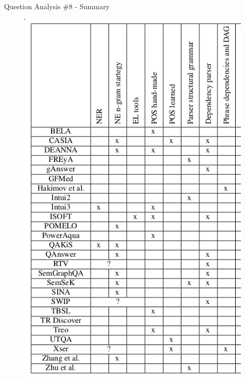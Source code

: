 \documentclass{beamer}
\begin{document}
\begin{frame}{Question Analysis \#8 - Summary}
  \begin{cardTiny}
    \begin{figure}\label{fig:qa_table}
      \centering
      \includegraphics[height=0.8\textheight]{./res/qa_table.png}
    \end{figure}
  \end{cardTiny}
\end{frame}

\note{}
\end{document}
